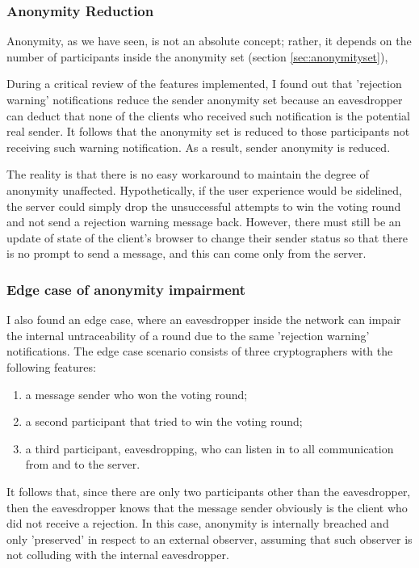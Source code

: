 \subsubsection{Anonymity Reduction} \label{sec:anonymityReductionLimitation}
Anonymity, as we have seen, is not an absolute concept; rather, it depends on the number of participants inside the anonymity set (section \ref{sec:anonymityset}), 

During a critical review of the features implemented, I found out that 'rejection warning' notifications reduce the sender anonymity set because an eavesdropper can deduct that none of the clients who received such notification is the potential real sender. It follows that the anonymity set is reduced to those participants not receiving such warning notification. As a result, sender anonymity is reduced.

The reality is that there is no easy workaround to maintain the degree of anonymity unaffected. Hypothetically, if the user experience would be sidelined, the server could simply drop the unsuccessful attempts to win the voting round and not send a rejection warning message back. However, there must still be an update of state of the client's browser to change their sender status so that there is no prompt to send a message, and this can come only from the server.

\subsubsection{Edge case of anonymity impairment} \label{sec:anonymityImpairmentEdgeCase}
I also found an edge case, where an eavesdropper inside the network can impair the internal untraceability of a round due to the same 'rejection warning' notifications. The edge case scenario consists of three cryptographers with the following features: 

\begin{enumerate}
    \item a message sender who won the voting round;
    \item a second participant that tried to win the voting round;
    \item a third participant, eavesdropping, who can listen in to all communication from and to the server.
\end{enumerate}
It follows that, since there are only two participants other than the eavesdropper, then the eavesdropper knows that the message sender obviously is the client who did not receive a rejection. In this case, anonymity is internally breached and only 'preserved' in respect to an external observer, assuming that such observer is not colluding with the internal eavesdropper.


